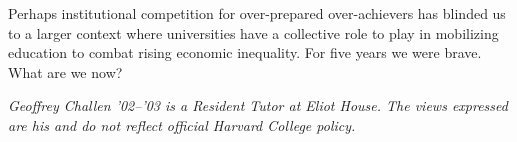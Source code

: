 Perhaps institutional competition for over-prepared over-achievers has
blinded us to a larger context where universities have a collective role to
play in mobilizing education to combat rising economic inequality. For five
years we were brave. What are we now?


\textit{Geoffrey Challen '02--'03 is a Resident Tutor at Eliot House. The
views expressed are his and do not reflect official Harvard College policy.}
